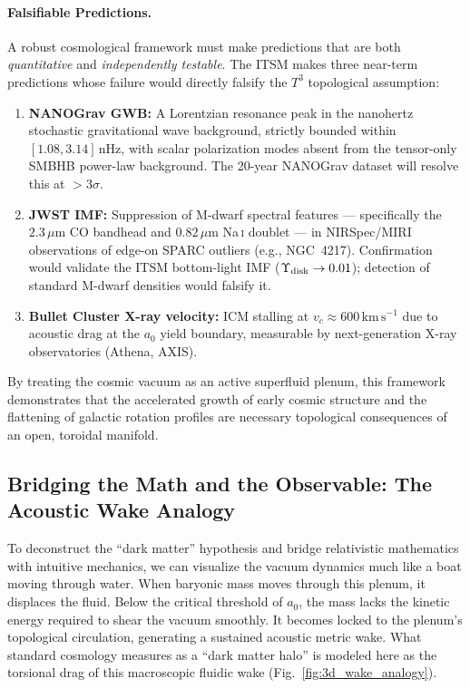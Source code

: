 \documentclass[aps,prd,10pt,twocolumn,superscriptaddress,nofootinbib,floatfix]{revtex4-2}
\begin{document}
\paragraph{Falsifiable Predictions.}
A robust cosmological framework must make predictions that are both \emph{quantitative} and \emph{independently testable}. The ITSM makes three near-term predictions whose failure would directly falsify the $T^3$ topological assumption:
\begin{enumerate}
    \item \textbf{NANOGrav GWB:} A Lorentzian resonance peak in the nanohertz stochastic gravitational wave background, strictly bounded within $[1.08, 3.14]\,\text{nHz}$, with scalar polarization modes absent from the tensor-only SMBHB power-law background. The 20-year NANOGrav dataset will resolve this at $>3\sigma$.
    \item \textbf{JWST IMF:} Suppression of M-dwarf spectral features --- specifically the $2.3\,\mu\text{m}$ CO bandhead and $0.82\,\mu\text{m}$ Na\,\textsc{i} doublet --- in NIRSpec/MIRI observations of edge-on SPARC outliers (e.g., NGC~4217). Confirmation would validate the ITSM bottom-light IMF ($\Upsilon_{\rm disk}\to 0.01$); detection of standard M-dwarf densities would falsify it.
    \item \textbf{Bullet Cluster X-ray velocity:} ICM stalling at $v_c \approx 600\,\text{km}\,\text{s}^{-1}$ due to acoustic drag at the $a_0$ yield boundary, measurable by next-generation X-ray observatories (Athena, AXIS).
\end{enumerate}

By treating the cosmic vacuum as an active superfluid plenum, this framework demonstrates that the accelerated growth of early cosmic structure and the flattening of galactic rotation profiles are necessary topological consequences of an open, toroidal manifold.

\subsection{Bridging the Math and the Observable: The Acoustic Wake Analogy}
To deconstruct the ``dark matter'' hypothesis and bridge relativistic mathematics with intuitive mechanics, we can visualize the vacuum dynamics much like a boat moving through water. When baryonic mass moves through this plenum, it displaces the fluid. Below the critical threshold of $a_0$, the mass lacks the kinetic energy required to shear the vacuum smoothly. It becomes locked to the plenum's topological circulation, generating a sustained acoustic metric wake. What standard cosmology measures as a ``dark matter halo'' is modeled here as the torsional drag of this macroscopic fluidic wake (Fig.~\ref{fig:3d_wake_analogy}).
\end{document}
